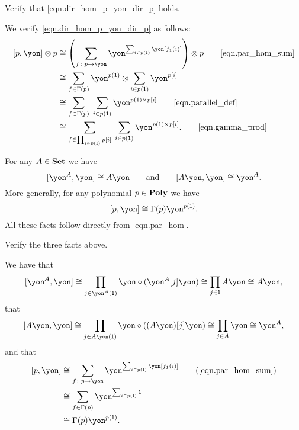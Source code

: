 \documentclass[Book-Poly]{subfiles}
\begin{document}
\begin{exercise} \label{exc.dir_hom_p_yon_dir_p}
Verify that \eqref{eqn.dir_hom_p_yon_dir_p} holds.
\begin{solution}
We verify \eqref{eqn.dir_hom_p_yon_dir_p} as follows:
\begin{align*}
    \ihom{p, \yon} \otimes p
    &\iso
    \left(\sum_{f \colon p \to \yon} \yon^{\sum_{i \in p(\1)} \yon[f_1(i)]}\right) \otimes p
    \tag*{\eqref{eqn.par_hom_sum}} \\
    &\iso
    \sum_{f \in \Gamma(p)} \yon^{p(\1)} \otimes \sum_{i \in p(\1)} \yon^{p[i]} \\
    &\iso
    \sum_{f \in \Gamma(p)} \; \sum_{i \in p(\1)} \yon^{p(\1) \times p[i]}
    \tag*{\eqref{eqn.parallel_def}} \\
    &\iso
    \sum_{f \in \prod_{i \in p(\1)} p[i]} \; \sum_{i \in p(\1)} \yon^{p(\1) \times p[i]}.
    \tag*{\eqref{eqn.gamma_prod}}
\end{align*}
\end{solution}
\end{exercise}

\begin{example}\label{ex.parallel_dual}
For any $A\in\mathbf{Set}$ we have
\[
  \ihom{\yon^A,\yon} \iso A\yon
  \qqand
  \ihom{A\yon,\yon} \iso \yon^A.
\]
More generally, for any polynomial $p\in\mathbf{Poly}$ we have
\begin{equation}\label{eqn.dir_dual}
  \ihom{p,\yon} \iso \Gamma(p)\yon^{p(\1)}.
\end{equation}
All these facts follow directly from \eqref{eqn.par_hom}.
\end{example}

\begin{exercise}
Verify the three facts above.
\begin{solution}
We have that
\[
    \ihom{\yon^A, \yon} \iso \prod_{j \in \yon^A(\1)} \yon \circ (\yon^A[j]\yon) \iso \prod_{j \in \1} A\yon \iso A\yon,
\]
that
\[
    \ihom{A\yon, \yon} \iso \prod_{j \in A\yon(\1)} \yon \circ ((A\yon)[j]\yon) \iso \prod_{j \in A} \yon \iso \yon^A,
\]
and that
\begin{align*}
    \ihom{p, \yon} &\iso \sum_{f \colon p \to \yon} \yon^{\sum_{i \in p(\1)} \yon[f_1(i)]} \tag{\cref{eqn.par_hom_sum}} \\
    &\iso \sum_{f \in \Gamma(p)} \yon^{\sum_{i \in p(\1)} \1} \\
    &\iso \Gamma(p)\yon^{p(\1)}.
\end{align*}
\end{solution}
\end{exercise}
\end{document}
